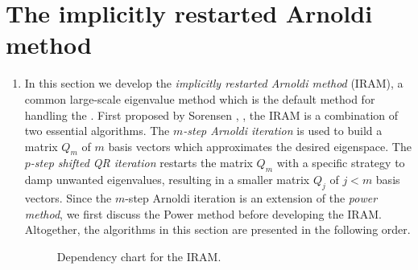 







\newpage

\section{The implicitly restarted Arnoldi method}		\label{Subsec:evol_mats-IRAM}

\begin{enumerate}


\item




In this section we develop the \textit{implicitly restarted Arnoldi method} (IRAM), a common large-scale eigenvalue method which is the default method for handling the \emep.  First proposed by Sorensen \cite{sorensen1992implicit}, \cite{sorensen1997implicitly}, the IRAM is a combination of two essential algorithms.  The \textit{$m$-step Arnoldi iteration} is used to build a matrix $Q_m$ of $m$ basis vectors which approximates the desired eigenspace.  The \textit{$p$-step shifted QR iteration} restarts the matrix $Q_m$ with a specific strategy to damp unwanted eigenvalues, resulting in a smaller matrix $Q_j$ of $j<m$ basis vectors.  Since the $m$-step Arnoldi iteration is an extension of the \textit{power method}, we first discuss the Power method before developing the IRAM.  Altogether, the algorithms in this section are presented in the following order.

\begin{figure}[H] 
\centering
{}
\caption{Dependency chart for the IRAM.}
\label{Fig:IRAM_flowchart}
\end{figure}


\end{enumerate}
